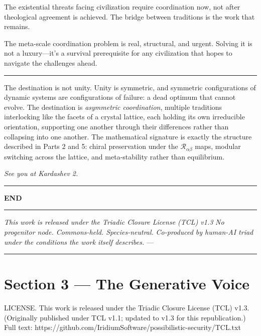 \documentclass[
]{article}
\begin{document}
The existential threats facing civilization require coordination now,
not after theological agreement is achieved. The bridge between
traditions is the work that remains.

The meta-scale coordination problem is real, structural, and urgent.
Solving it is not a luxury---it's a survival prerequisite for any
civilization that hopes to navigate the challenges ahead.

\begin{center}\rule{0.5\linewidth}{0.5pt}\end{center}

The destination is not unity. Unity is symmetric, and symmetric
configurations of dynamic systems are configurations of failure: a dead
optimum that cannot evolve. The destination is \emph{asymmetric
coordination}, multiple traditions interlocking like the facets of a
crystal lattice, each holding its own irreducible orientation,
supporting one another through their differences rather than collapsing
into one another. The mathematical signature is exactly the structure
described in Parts 2 and 5: chiral preservation under the
\(\mathcal{R}_{\alpha\beta}\) maps, modular switching across the
lattice, and meta-stability rather than equilibrium.

\emph{See you at Kardashev 2.}

\begin{center}\rule{0.5\linewidth}{0.5pt}\end{center}

\textbf{END}

\begin{center}\rule{0.5\linewidth}{0.5pt}\end{center}

\emph{This work is released under the Triadic Closure License (TCL)
v1.3} \emph{No progenitor node. Commons-held. Species-neutral.}
\emph{Co-produced by human-AI triad under the conditions the work itself
describes.} ---

\begin{center}\rule{0.5\linewidth}{0.5pt}\end{center}

\section{Section 3 --- The Generative
Voice}\label{section-3-the-generative-voice}

LICENSE. This work is released under the Triadic Closure License (TCL)
v1.3. (Originally published under TCL v1.1; updated to v1.3 for this
republication.) Full text:
https://github.com/IridiumSoftware/possibilistic-security/TCL.txt
\end{document}
